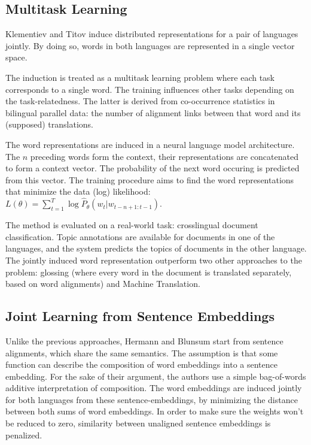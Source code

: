 \subsection{Multitask Learning}

Klementiev and Titov \cite{klementiev2012inducing} induce distributed representations for a pair of languages jointly. By doing so, words in both languages are represented in a single vector space.

The induction is treated as a multitask learning problem where each task corresponds to a single word. The training influences other tasks depending on the task-relatedness. The latter is derived from co-occurrence statistics in bilingual parallel data: the number of alignment links between  that word and its (supposed) translations. 

The word representations are induced in a neural language model architecture. 
The $n$ preceding words form the context, their representations are concatenated to form a context vector. The probability of the next word occuring is predicted from this vector. The training procedure aims to find the word representations that minimize the data (log) likelihood: 
$L(\theta) = \sum_{t=1}^T \log \hat{P}_\theta (w_t|w_{t-n+1:t-1})$. 

The method is evaluated on a real-world task: crosslingual document classification. Topic annotations are available for documents in one of the languages, and the system predicts the topics of documents in the other language. The jointly induced word representation outperform two other approaches to the problem: glossing (where every word in the document is translated separately, based on word alignments) and Machine Translation.


\subsection{Joint Learning from Sentence Embeddings}

Unlike the previous approaches, Hermann and Blunsum \cite{hermann2013multilingual} start from sentence alignments, which share the same semantics.
The assumption is that some function can describe the composition of word embeddings into a sentence embedding.
For the sake of their argument, the authors use a simple bag-of-words additive interpretation of composition. 
The word embeddings are induced jointly for both languages from these sentence-embeddings, by minimizing the distance between both sums of word embeddings.
In order to make sure the weights won't be reduced to zero, similarity between unaligned sentence embeddings is penalized.

